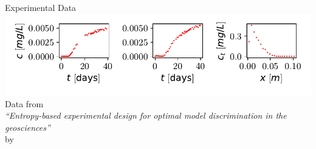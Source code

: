 \documentclass[aspectratio=1610]{beamer}
\begin{document}
\begin{frame}{Experimental Data}
\centering
{}
\includegraphics[width=\textwidth]{figs/core_data.pdf}
\footnotesize
Data from\\ \textit{``Entropy-based experimental design for optimal model discrimination in the geosciences''}\\ by \textcite{nowak2016entropy}
\end{frame}
\end{document}
